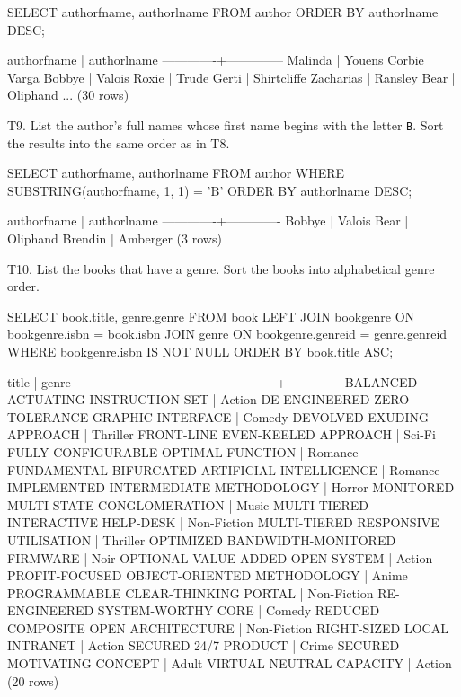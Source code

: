 \begin{sql}
SELECT authorfname, authorlname FROM author
ORDER BY authorlname DESC;
\end{sql} 
\begin{pseudo}
 authorfname | authorlname
-------------+--------------
 Malinda     | Youens
 Corbie      | Varga
 Bobbye      | Valois
 Roxie       | Trude
 Gerti       | Shirtcliffe
 Zacharias   | Ransley
 Bear        | Oliphand
...
(30 rows)
\end{pseudo}

T9. List the author's full names whose first name  begins with the letter \verb|B|. Sort the results into the same order as in T8.

\begin{sql}
SELECT authorfname, authorlname FROM author
WHERE SUBSTRING(authorfname, 1, 1) = 'B'
ORDER BY authorlname DESC;
\end{sql}
\begin{pseudo}
 authorfname | authorlname
-------------+-------------
 Bobbye      | Valois
 Bear        | Oliphand
 Brendin     | Amberger
(3 rows)
\end{pseudo}

T10. List the books that have a genre. Sort the books into alphabetical genre order.
\begin{sql}
SELECT book.title, genre.genre FROM book
LEFT JOIN bookgenre ON bookgenre.isbn = book.isbn
JOIN genre ON bookgenre.genreid = genre.genreid
WHERE bookgenre.isbn IS NOT NULL
ORDER BY book.title ASC;
\end{sql}

\begin{pseudo}
                     title                      |    genre
------------------------------------------------+-------------
 BALANCED ACTUATING INSTRUCTION SET             | Action
 DE-ENGINEERED ZERO TOLERANCE GRAPHIC INTERFACE | Comedy
 DEVOLVED EXUDING APPROACH                      | Thriller
 FRONT-LINE EVEN-KEELED APPROACH                | Sci-Fi
 FULLY-CONFIGURABLE OPTIMAL FUNCTION            | Romance
 FUNDAMENTAL BIFURCATED ARTIFICIAL INTELLIGENCE | Romance
 IMPLEMENTED INTERMEDIATE METHODOLOGY           | Horror
 MONITORED MULTI-STATE CONGLOMERATION           | Music
 MULTI-TIERED INTERACTIVE HELP-DESK             | Non-Fiction
 MULTI-TIERED RESPONSIVE UTILISATION            | Thriller
 OPTIMIZED BANDWIDTH-MONITORED FIRMWARE         | Noir
 OPTIONAL VALUE-ADDED OPEN SYSTEM               | Action
 PROFIT-FOCUSED OBJECT-ORIENTED METHODOLOGY     | Anime
 PROGRAMMABLE CLEAR-THINKING PORTAL             | Non-Fiction
 RE-ENGINEERED SYSTEM-WORTHY CORE               | Comedy
 REDUCED COMPOSITE OPEN ARCHITECTURE            | Non-Fiction
 RIGHT-SIZED LOCAL INTRANET                     | Action
 SECURED 24/7 PRODUCT                           | Crime
 SECURED MOTIVATING CONCEPT                     | Adult
 VIRTUAL NEUTRAL CAPACITY                       | Action
(20 rows)
\end{pseudo}

